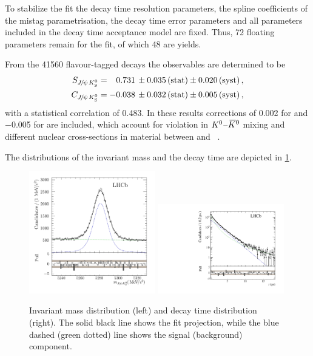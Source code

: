 To stabilize the fit the decay time resolution parameters, the spline
coefficients of the mistag parametrisation, the decay time error parameters
and all parameters included in the decay time acceptance model are fixed.
Thus, \num{72} floating parameters remain for the fit, of which \num{48} are
yields.

From the \num{41560} flavour-tagged \BdToJPsiKS decays the \CP observables are determined to be
\begin{align*}
  S_{{{J\mskip -3mu/\mskip -2mu\psi\mskip 2mu}}{{K}^0_{\mathrm{ \scriptscriptstyle S}}}} &=  \phantom{-}0.731 \, \pm 0.035 \, \text{(stat)} \pm 0.020 \, \text{(syst)}\,, \\
  C_{{{J\mskip -3mu/\mskip -2mu\psi\mskip 2mu}}{{K}^0_{\mathrm{ \scriptscriptstyle S}}}} &=  			- 0.038 \, \pm 0.032 \, \text{(stat)} \pm 0.005 \, \text{(syst)}\,,
\end{align*}
with a statistical correlation of \num{0.483}. In these results corrections of
\num{+0.002} for \SJpsiKS and \num{-0.005} for \CJpsiKS are included, which
account for \CP violation in ${{K}^0}$--${{\kern 0.2em\overline{\kern -0.2em K}{}}{}^0}$ mixing and different nuclear
cross-sections in material between \Kz and
\Kzb~\cite{Fetscher:1996fa,*Ko:2010mk}.

The distributions of the invariant mass and the decay time are depicted in
\cref{fig:bd2jpsiks:nominalfit:mass_and_time}.

\begin{figure}[htb]
\includegraphics[width=0.49\textwidth]{06-Bd2JpsiKS/tikz/pdf/MassPulls_summed.pdf}
\includegraphics[width=0.49\textwidth]{06-Bd2JpsiKS/figs/obsTime_summed_pull_log.pdf}
\caption{
Invariant mass distribution (left) and decay time distribution (right). The solid black line
shows the fit projection, while the blue dashed (green dotted) line shows the
signal (background) component.}
\label{fig:bd2jpsiks:nominalfit:mass_and_time}
\end{figure}
